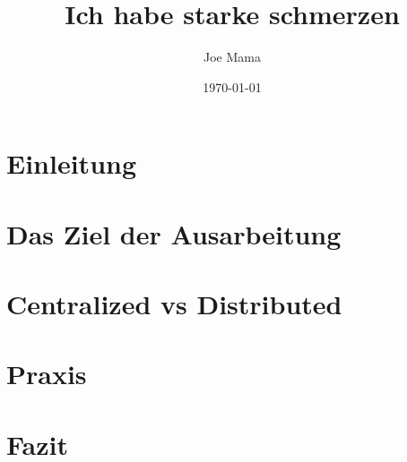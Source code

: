 \documentclass[12pt]{article}
\title{Ich habe starke schmerzen }
\author{Joe Mama}
\date{\today}
\begin{document}
    
    \newpage

    \tableofcontents
    \newpage

    \section{Einleitung}
        
    
    \section{Das Ziel der Ausarbeitung} 
        
    
    \section{Centralized vs Distributed}
        
    
    \section{Praxis}
        
    
    \section{Fazit}
        
    
    \newpage
    \printbibliography
\end{document}
